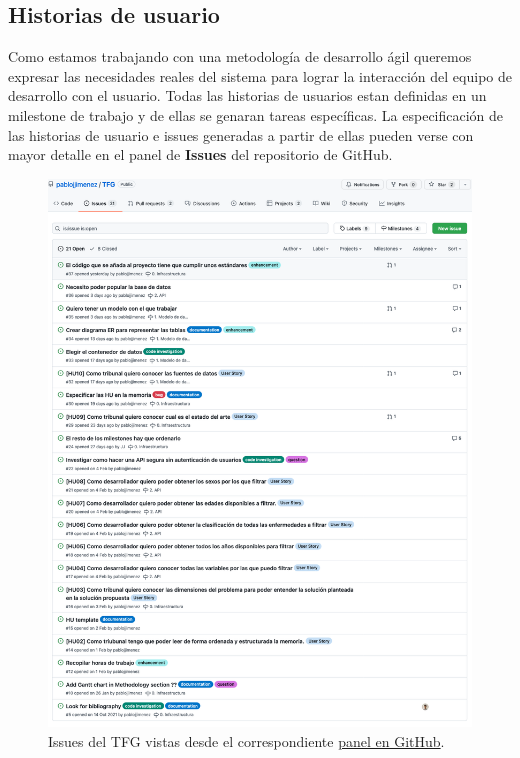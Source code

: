 \subsection{Historias de usuario}
Como estamos trabajando con una metodología de desarrollo ágil queremos expresar las necesidades reales del sistema para
lograr la interacción del equipo de desarrollo con el usuario. Todas las historias de usuarios estan definidas en un milestone
de trabajo y de ellas se genaran tareas específicas. La especificación de las historias de usuario e issues generadas a partir de ellas
pueden verse con mayor detalle en el panel de \textbf{Issues} del repositorio de GitHub.
\begin{figure}[]
	\centering
	\includegraphics[scale=0.5]{doc/logos/imgs/issues.png}
	\caption{ \cite{rtve-cis}  Issues del TFG vistas desde el correspondiente \href{https://github.com/pablojjimenez/TFG/issues}{panel en GitHub}. }
    \label{fig:worst_f_value}
\end{figure}

